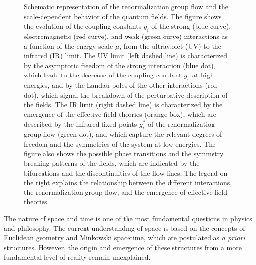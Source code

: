 \begin{figure}[h]
\caption{Schematic representation of the renormalization group flow and the scale-dependent behavior of the quantum fields. The figure shows the evolution of the coupling constants $g_i$ of the strong (blue curve), electromagnetic (red curve), and weak (green curve) interactions as a function of the energy scale $\mu$, from the ultraviolet (UV) to the infrared (IR) limit. The UV limit (left dashed line) is characterized by the asymptotic freedom of the strong interaction (blue dot), which leads to the decrease of the coupling constant $g_s$ at high energies, and by the Landau poles of the other interactions (red dot), which signal the breakdown of the perturbative description of the fields. The IR limit (right dashed line) is characterized by the emergence of the effective field theories (orange box), which are described by the infrared fixed points $g_i^*$ of the renormalization group flow (green dot), and which capture the relevant degrees of freedom and the symmetries of the system at low energies. The figure also shows the possible phase transitions and the symmetry breaking patterns of the fields, which are indicated by the bifurcations and the discontinuities of the flow lines. The legend on the right explains the relationship between the different interactions, the renormalization group flow, and the emergence of effective field theories.}
\label{fig:renormalization_group}
\end{figure}
The nature of space and time is one of the most fundamental questions in physics and philosophy. The current understanding of space is based on the concepts of Euclidean geometry and Minkowski spacetime, which are postulated as \textit{a priori} structures. However, the origin and emergence of these structures from a more fundamental level of reality remain unexplained. 

